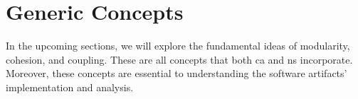 \section{Generic Concepts} \label{section_key_concepts}

In the upcoming sections, we will explore the fundamental ideas of modularity, cohesion,
and coupling. These are all concepts that both \gls{ca} and \gls{ns} incorporate.
Moreover, these concepts are essential to understanding the software artifacts'
implementation and analysis.



